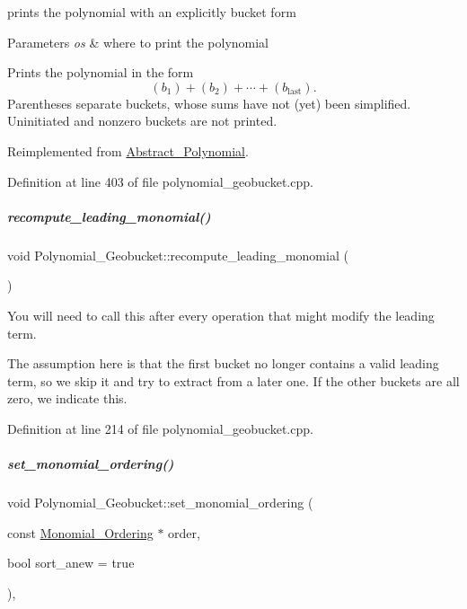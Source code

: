 prints the polynomial with an explicitly bucket form 


\begin{DoxyParams}{Parameters}
{\em os} & where to print the polynomial\\
\hline
\end{DoxyParams}
Prints the polynomial in the form \[(b_1) + (b_2) + \cdots + (b_\textrm{last}).\] Parentheses separate buckets, whose sums have not (yet) been simplified. Uninitiated and nonzero buckets are not printed. 

Reimplemented from \hyperlink{group__polygroup}{Abstract\+\_\+\+Polynomial}.



Definition at line 403 of file polynomial\+\_\+geobucket.\+cpp.

\mbox{\label{group__polygroup_ab57dbe8d5f0d3860997775d9f354ab0c}} 
\subparagraph{\texorpdfstring{recompute\+\_\+leading\+\_\+monomial()}{recompute\_leading\_monomial()}}
{\footnotesize\ttfamily void Polynomial\+\_\+\+Geobucket\+::recompute\+\_\+leading\+\_\+monomial (\begin{DoxyParamCaption}{ }\end{DoxyParamCaption})}



You will need to call this after every operation that might modify the leading term. 

The assumption here is that the first bucket no longer contains a valid leading term, so we skip it and try to extract from a later one. If the other buckets are all zero, we indicate this. 

Definition at line 214 of file polynomial\+\_\+geobucket.\+cpp.

\mbox{\label{group__polygroup_ad3298b3201f53d0ddaa657206c140ca8}} 
\subparagraph{\texorpdfstring{set\+\_\+monomial\+\_\+ordering()}{set\_monomial\_ordering()}}
{\footnotesize\ttfamily void Polynomial\+\_\+\+Geobucket\+::set\+\_\+monomial\+\_\+ordering (\begin{DoxyParamCaption}\item[{const \hyperlink{group__orderinggroup_class_monomial___ordering}{Monomial\+\_\+\+Ordering} $\ast$}]{order,  }\item[{bool}]{sort\+\_\+anew = {\ttfamily true} }\end{DoxyParamCaption})\hspace{0.3cm}{\ttfamily [override]}, {\ttfamily [virtual]}}



